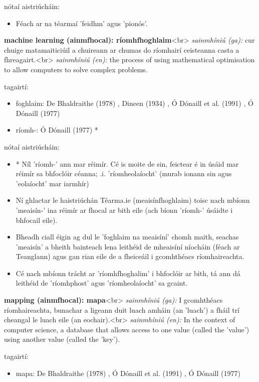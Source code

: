 \documentclass{article}
\begin{document}
nótaí aistriúcháin:
\begin{itemize}
	\item Féach ar na téarmaí 'feidhm' agus 'pionós'.
\end{itemize}


\textbf{machine learning (ainmfhocal): ríomhfhoghlaim}<br>
\textit{sainmhíniú (ga):} cur chuige matamaiticiúil a chuireann ar chumas do ríomhairí ceisteanna casta a fhreagairt.<br>
\textit{sainmhíniú (en):} the process of using mathematical optimisation to allow computers to solve complex problems.

tagairtí:
\begin{itemize}
	\item foghlaim: De Bhaldraithe (1978) \cite{de-bhaldraithe}, Dineen (1934) \cite{dineen}, Ó Dónaill et al. (1991) \cite{focloir-beag}, Ó Dónaill (1977) \cite{odonaill}
	\item ríomh-: Ó Dónaill (1977) \cite{odonaill}*
\end{itemize}

nótaí aistriúcháin:
\begin{itemize}
	\item * Níl 'ríomh-' ann mar réimír. Cé is moite de sin, feictear é in úsáid mar réimír sa bhfoclóir céanna; .i. 'ríomheolaíocht' (murab ionann sin agus 'eolaíocht' mar iarmhír)
	\item Ní ghlactar le haistriúchán Téarma.ie (meaisínfhoghlaim) toisc nach mbíonn 'meaisín-' ina réimír ar fhocal ar bith eile (ach bíonn 'ríomh-' úsáidte i bhfocail eile).
	\item Bheadh ciall éigin ag dul le 'foghlaim na meaisíní' chomh maith, seachas 'meaisín' a bheith bainteach lena leithéid de mheaisíní níocháin (féach ar Teanglann) agus gan rian eile de a fheiceáil i gcomhthéacs ríomhaireachta.
	\item Cé nach mbíonn trácht ar 'ríomhfhoghalim' i bhfoclóir ar bith, tá ann dá leithéid de 'ríomhphost' agus 'ríomheolaíocht' sa gcaint.
\end{itemize}


\textbf{mapping (ainmfhocal): mapa}<br>
\textit{sainmhíniú (ga):} I gcomhthéacs ríomhaireachta, bunachar a ligeann duit luach amháin (an 'luach') a fháil trí cheangal le luach eile (an eochair).<br>
\textit{sainmhíniú (en):} In the context of computer science, a database that allows access to one value (called the 'value') using another value (called the 'key').

tagairtí:
\begin{itemize}
	\item mapa: De Bhaldraithe (1978) \cite{de-bhaldraithe}, Ó Dónaill et al. (1991) \cite{focloir-beag}, Ó Dónaill (1977) \cite{odonaill}
\end{itemize}
\end{document}

